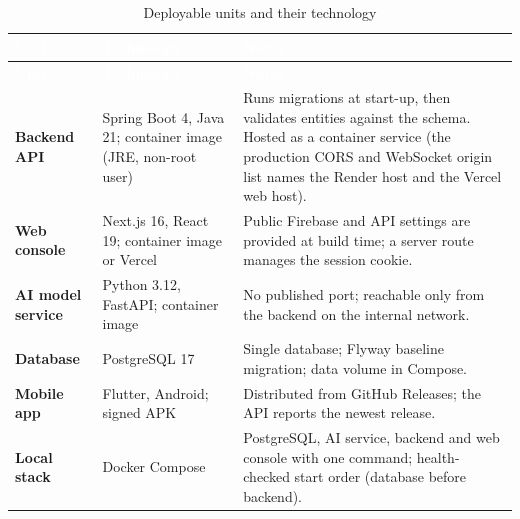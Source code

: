 {\tabfont\rowband
\begin{longtable}{@{}>{\raggedright\arraybackslash}p{}>{\raggedright\arraybackslash}p{}>{\raggedright\arraybackslash}p{}@{}}
\caption{Deployable units and their technology}\label{tab:deploy-units}\\
\rowcolor{najdanavy}\textcolor{white}{\sffamily\bfseries\small Unit} & \textcolor{white}{\sffamily\bfseries\small Technology} & \textcolor{white}{\sffamily\bfseries\small Notes}\\
\endfirsthead
\rowcolor{najdanavy}\textcolor{white}{\sffamily\bfseries\small Unit} & \textcolor{white}{\sffamily\bfseries\small Technology} & \textcolor{white}{\sffamily\bfseries\small Notes}\\
\endhead
\bottomrule\endlastfoot
\textbf{Backend API} & Spring Boot 4, Java 21; container image (JRE, non-root user) & Runs migrations at start-up, then validates entities against the schema. Hosted as a container service (the production CORS and WebSocket origin list names the Render host and the Vercel web host).\\
\textbf{Web console} & Next.js 16, React 19; container image or Vercel & Public Firebase and API settings are provided at build time; a server route manages the session cookie.\\
\textbf{AI model service} & Python 3.12, FastAPI; container image & No published port; reachable only from the backend on the internal network.\\
\textbf{Database} & PostgreSQL 17 & Single database; Flyway baseline migration; data volume in Compose.\\
\textbf{Mobile app} & Flutter, Android; signed APK & Distributed from GitHub Releases; the API reports the newest release.\\
\textbf{Local stack} & Docker Compose & PostgreSQL, AI service, backend and web console with one command; health-checked start order (database before backend).\\
\end{longtable}}
